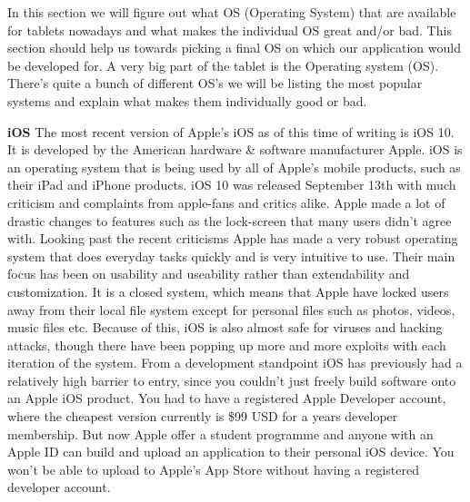 In this section we will figure out what OS (Operating System) that are available for tablets nowadays and what makes the individual OS great and/or bad. This section should help us towards picking a final OS on which our application would be developed for. 
A very big part of the tablet is the Operating system (OS). There's quite a bunch of different OS's we will be listing the most popular systems and explain what makes them individually good or bad.

\textbf{iOS}\newline
The most recent version of Apple's iOS as of this time of writing is iOS 10. It is developed by the American hardware \& software manufacturer Apple. iOS is an operating system that is being used by all of Apple's mobile products, such as their iPad and iPhone products. iOS 10 was released September 13th\cite{macworld:iosreleasedate} with much criticism and complaints from apple-fans and critics alike. Apple made a lot of drastic changes to features such as the lock-screen that many users didn't agree with. Looking past the recent criticisms Apple has made a very robust operating system that does everyday tasks quickly and is very intuitive to use. Their main focus has been on usability and useability rather than extendability and customization. It is a closed system, which means that Apple have locked users away from their local file system except for personal files such as photos, videos, music files etc. Because of this, iOS is also almost safe for viruses and hacking attacks, though there have been popping up more and more exploits\cite{xiao:claud} with each iteration of the system. 
From a development standpoint iOS has previously had a relatively high barrier to entry, since you couldn't just freely build software onto an Apple iOS product. You had to have a registered Apple Developer account, where the cheapest version currently is \$99 USD for a years developer membership. But now Apple offer a student programme and anyone with an Apple ID can build and upload an application to their personal iOS device. You won't be able to upload to Apple's App Store without having a registered developer account\cite{apple:developerprogram}. 

